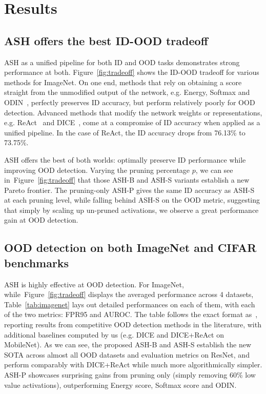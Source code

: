 \documentclass{article}
\newcommand{\figref}[1]{Figure~\ref{fig:#1}}
\newcommand{\seclabel}[1]{\label{sec:#1}}
\newcommand{\tabref}[1]{Table~\ref{tab:#1}}
\begin{document}
\section{Results}
\seclabel{ood}

\subsection{ASH offers the best ID-OOD tradeoff}
ASH as a unified pipeline for both ID and OOD tasks demonstrates strong performance at both. \figref{tradeoff} shows the ID-OOD tradeoff for various methods for ImageNet. On one end, methods that rely on obtaining a score straight from the unmodified output of the network, e.g. Energy, Softmax and ODIN~\citep{Liang2017}, perfectly preserves ID accuracy, but perform relatively poorly for OOD detection. Advanced methods that modify the network weights or representations, e.g. ReAct~\citep{react} and DICE~\citep{sun2022dice}, come at a compromise of ID accuracy when applied as a unified pipeline. In the case of ReAct, the ID accuracy drops from 76.13\% to 73.75\%.

ASH offers the best of both worlds: optimally preserve ID performance while improving OOD detection. Varying the pruning percentage $p$, we can see in~\figref{tradeoff} that those ASH-B and ASH-S variants establish a new Pareto frontier. The pruning-only ASH-P gives the same ID accuracy as ASH-S at each pruning level, while falling behind ASH-S on the OOD metric, suggesting that simply by scaling up un-pruned activations, we observe a great performance gain at OOD detection. 


\subsection{OOD detection on both ImageNet and CIFAR benchmarks}

ASH is highly effective at OOD detection. For ImageNet, while~\figref{tradeoff} displays the averaged performance across 4 datasets, \tabref{imagenet} lays out detailed performances on each of them, with each of the two metrics: FPR95 and AUROC. The table follows the exact format as~\citet{react}, reporting results from competitive OOD detection methods in the literature, with additional baselines computed by us (e.g. DICE and DICE+ReAct on MobileNet). As we can see, the proposed ASH-B and ASH-S establish the new SOTA across almost all OOD datasets and evaluation metrics on ResNet, and perform comparably with DICE+ReAct while much more algorithmically simpler. ASH-P showcases surprising gains from pruning only (simply removing 60\% low value activations), outperforming Energy score, Softmax score and ODIN.
\end{document}
